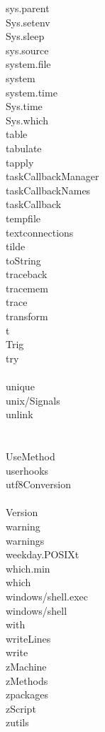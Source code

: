 \documentclass[12pt]{article}
\begin{document}
{sys.parent} \\
{Sys.setenv} \\
{Sys.sleep} \\
{sys.source} \\
{system.file} \\
{system} \\
{system.time} \\
{Sys.time} \\
{Sys.which} \\
{table} \\
{tabulate} \\
{tapply} \\
{taskCallbackManager} \\
{taskCallbackNames} \\
{taskCallback} \\
{tempfile} \\
{textconnections} \\
{tilde} \\
{toString} \\
{traceback} \\
{tracemem} \\
{trace} \\
{transform} \\
{t} \\
{Trig} \\
{try} \\
 \\
{unique} \\
{unix/Signals} \\
{unlink} \\
 \\
 \\
{UseMethod} \\
{userhooks} \\
{utf8Conversion} \\
 \\
{Version} \\
{warning} \\
{warnings} \\
{weekday.POSIXt} \\
{which.min} \\
{which} \\
{windows/shell.exec} \\
{windows/shell} \\
{with} \\
{writeLines} \\
{write} \\
{zMachine} \\
{zMethods} \\
{zpackages} \\
{zScript} \\
{zutils}
\end{document}

